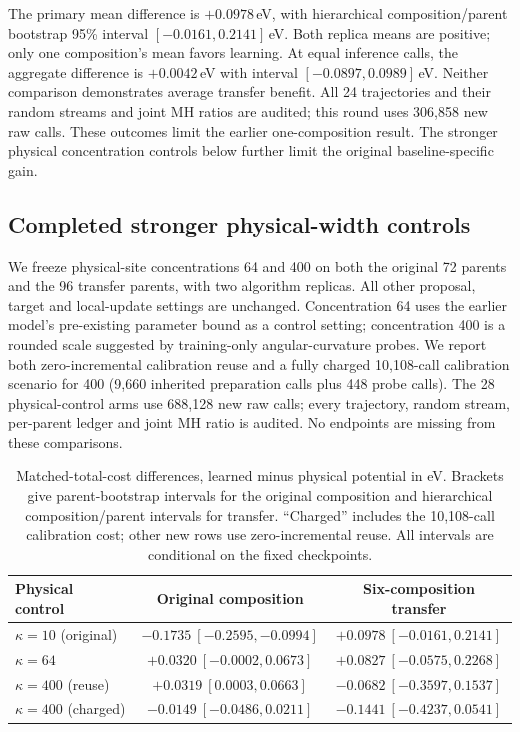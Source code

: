 The primary mean difference is $+0.0978$\,eV, with hierarchical composition/parent
bootstrap 95\% interval $[-0.0161,0.2141]$\,eV. Both replica means are positive;
only one composition's mean favors learning. At equal inference calls, the
aggregate difference is $+0.0042$\,eV with interval $[-0.0897,0.0989]$\,eV.
Neither comparison demonstrates average transfer benefit. All 24 trajectories
and their random streams and joint MH ratios are audited; this round uses
306,858 new raw calls. These outcomes limit the earlier one-composition result.
The stronger physical concentration controls below further limit the original
baseline-specific gain.

\subsection{Completed stronger physical-width controls}
\label{app:sharp-controls}

We freeze physical-site concentrations 64 and 400 on both the original 72 parents
and the 96 transfer parents, with two algorithm replicas. All other proposal,
target and local-update settings are unchanged. Concentration 64 uses the earlier
model's pre-existing parameter bound as a control setting; concentration 400 is a
rounded scale suggested by training-only angular-curvature probes. We report
both zero-incremental calibration reuse and a fully charged 10,108-call
calibration scenario for 400 (9,660 inherited preparation calls plus 448 probe
calls). The 28 physical-control arms use 688,128 new raw calls; every trajectory,
random stream, per-parent ledger and joint MH ratio is audited. No endpoints are
missing from these comparisons.

\begin{table}[h]
\centering\small
\caption{Matched-total-cost differences, learned minus physical potential in eV.
Brackets give parent-bootstrap intervals for the original composition and
hierarchical composition/parent intervals for transfer. ``Charged'' includes the
10,108-call calibration cost; other new rows use zero-incremental reuse. All
intervals are conditional on the fixed checkpoints.}
\begin{tabular}{lcc}
\toprule
Physical control & Original composition & Six-composition transfer\\
\midrule
$\kappa=10$ (original) & $-0.1735\ [-0.2595,-0.0994]$ & $+0.0978\ [-0.0161,0.2141]$\\
$\kappa=64$ & $+0.0320\ [-0.0002,0.0673]$ & $+0.0827\ [-0.0575,0.2268]$\\
$\kappa=400$ (reuse) & $+0.0319\ [0.0003,0.0663]$ & $-0.0682\ [-0.3597,0.1537]$\\
$\kappa=400$ (charged) & $-0.0149\ [-0.0486,0.0211]$ & $-0.1441\ [-0.4237,0.0541]$\\
\bottomrule
\end{tabular}
\end{table}


